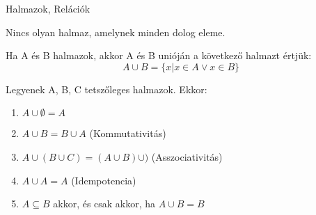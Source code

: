 

\begin{frame}[plain]
\begin{tcolorbox}[center, colback={myyellow}, coltext={black}, colframe={myyellow}]
    {\Huge Halmazok, Relációk}
    \mmedskip
\end{tcolorbox}
\end{frame}

\begin{frame}
\begin{tcolorbox}[title={Def.: A halmazelmélet "Definiálatlan alapfogalmai"}]
\end{tcolorbox}

\begin{tcolorbox}[title={Def.:  Meghatározottsági Axióma (Halmazok egyenlősége)}]
\end{tcolorbox}

\begin{tcolorbox}[title={Def.: Az üres halmz axiómája}]
\end{tcolorbox}

\begin{tcolorbox}[title={Def.: Részhalmaz-axióma}]
\end{tcolorbox}
\end{frame}

\begin{frame}
\begin{tcolorbox}[title={Tétel: Minden dolog halmaza}]
Nincs olyan halmaz, amelynek minden dolog eleme.
\end{tcolorbox}

\begin{tcolorbox}[title={Biz}]
\end{tcolorbox}
\end{frame}

\begin{frame}
\begin{tcolorbox}[title={Definíció: Unió}]
Ha A és B halmazok, akkor A és B unióján a következő halmazt értjük:\\
$$A \cup B = \{x | x \in A \vee x \in B\}$$
\end{tcolorbox}

\begin{tcolorbox}[title={Tétel: Az unió tulajdonságai}]
Legyenek A, B, C tetszőleges halmazok. Ekkor:

\begin{enumerate}
\item $A \cup \emptyset = A$
\item $A \cup B = B \cup A$ (Kommutativitás)
\item $A \cup (B \cup C) = (A \cup B) \cup )$ (Asszociativitás)
\item $A \cup A = A$ (Idempotencia)
\item $A \subseteq B$ akkor, és csak akkor, ha $A \cup B = B$
\end{enumerate}
\end{tcolorbox}
\end{frame}

